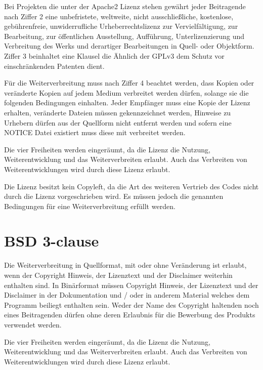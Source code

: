 Bei Projekten die unter der Apache2 Lizenz stehen gew\"ahrt jeder Beitragende nach Ziffer 2 eine unbefristete, weltweite, nicht ausschließliche, kostenlose, gebührenfreie, unwiderrufliche Urheberrechtslizenz zur Vervielfältigung, zur Bearbeitung, zur öffentlichen Ausstellung, Aufführung, Unterlizenzierung und Verbreitung des Werks und derartiger Bearbeitungen in Quell- oder Objektform. Ziffer 3 beinhaltet eine Klausel die \"Ahnlich der GPLv3 dem Schutz vor einschr\"ankenden Patenten dient. 

F\"ur die Weiterverbreitung muss nach Ziffer 4 beachtet werden, dass Kopien oder veränderte Kopien auf jedem Medium verbreitet werden d\"urfen, solange sie die folgenden Bedingungen einhalten. Jeder Empf\"anger muss eine Kopie der Lizenz erhalten, ver\"anderte Dateien m\"ussen gekennzeichnet werden, Hinweise zu Urhebern d\"urfen aus der Quellform nicht entfernt werden und sofern eine NOTICE Datei existiert muss diese mit verbreitet werden. 

Die vier Freiheiten werden einger\"aumt, da die Lizenz die Nutzung, Weiterentwicklung und das Weiterverbreiten erlaubt. Auch das Verbreiten von Weiterentwicklungen wird durch diese Lizenz erlaubt.

Die Lizenz besitzt kein Copyleft, da die Art des weiteren Vertrieb des Codes nicht durch die Lizenz vorgeschrieben wird. Es m\"ussen jedoch die genannten Bedingungen f\"ur eine Weiterverbreitung erf\"ullt werden.

\section{BSD 3-clause}

Die Weiterverbreitung in Quellformat, mit oder ohne Ver\"anderung ist erlaubt, wenn der Copyright Hinweis, der Lizenztext und der Disclaimer weiterhin enthalten sind. In Bin\"arformat m\"ussen Copyright Hinweis, der Lizenztext und der Disclaimer in der Dokumentation und / oder in anderem Material welches dem Programm beiliegt enthalten sein. Weder der Name des Copyright haltenden noch eines Beitragenden d\"urfen ohne deren Erlaubnis f\"ur die Bewerbung des Produkts verwendet werden. 

Die vier Freiheiten werden einger\"aumt, da die Lizenz die Nutzung, Weiterentwicklung und das Weiterverbreiten erlaubt. Auch das Verbreiten von Weiterentwicklungen wird durch diese Lizenz erlaubt.

